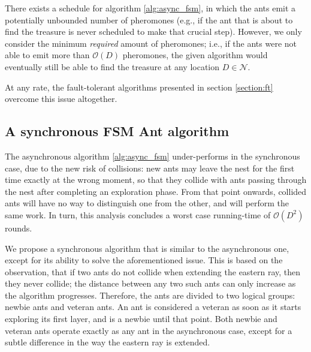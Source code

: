\begin{remark}\label{remark:pheromones}
There exists a schedule for algorithm \ref{alg:async_fsm},
in which the ants emit a potentially unbounded number
of pheromones (e.g., if the ant that is about to find the treasure is never scheduled to make 
that crucial step). However, we only consider the minimum \emph{required}
amount of pheromones; i.e., if the ants were not able to emit more than $\mathcal{O}(D)$
pheromones, the given algorithm would eventually still be able to find the treasure
at any location $D \in \mathcal{N}$.

At any rate, the fault-tolerant algorithms presented in section \ref{section:ft} overcome this 
issue altogether.
\end{remark}

\subsection{A synchronous FSM Ant algorithm}\label{sec:sync_fsm}

The asynchronous algorithm \ref{alg:async_fsm} under-performs in the synchronous case,
due to the new risk of collisions: new ants may leave the nest for the first time exactly at the
 wrong moment,
 so that they collide with ants passing through the nest 
after completing an exploration phase. From that point onwards, collided ants will have
no way to distinguish one from the other, and will perform the same work.
In turn, this analysis concludes a worst case running-time of $\mathcal{O}(D^2)$ rounds.

We propose a synchronous algorithm that is similar to the asynchronous one, except for its ability to 
solve the aforementioned issue. This is based on the observation, that if two ants do not collide when
 extending the eastern ray, then they never collide; the distance between any two such ants can only
 increase as the algorithm progresses. Therefore, the ants are divided to two logical groups:
newbie ants and veteran ants. An ant is considered a veteran as soon as it starts exploring its first layer,
and is a newbie until that point. Both newbie and veteran ants operate
 exactly as any ant in the asynchronous case, except for a subtle difference in the
way the eastern ray is extended.

